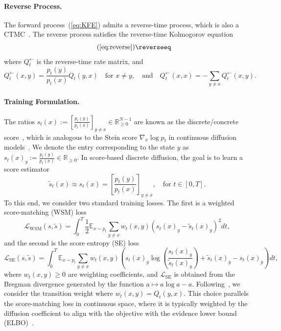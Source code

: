 \documentclass{article} %
\def\eqref#1{equation~\ref{#1}}
\newcommand{\half}{\frac{1}{2}}
\newcommand{\backQt}{Q_t^{\leftarrow}}
\newcommand{\LWSM}{\mathcal{L}_{\mathrm{WSM}}}
\newcommand{\LSE}{\mathcal{L}_{\mathrm{SE}}}
\renewcommand{\eqref}[1]{\textup{(\ref{#1})}}
\begin{document}
\paragraph{Reverse Process.} The forward process~\eqref{eq:KFE} admits a reverse-time process, which is also a CTMC~\citep{kelly1979reversibility}. The reverse process satisfies the reverse-time Kolmogorov equation
\begin{equation}\tag{\ref*{eq:reverse}}
    \reverseeq
\end{equation}
where $\backQt$ is the reverse-time rate matrix, and
\begin{equation}\label{eq:reverse_matrix}
    \backQt(x, y) = \frac{p_{t}(y)}{p_{t}(x)} Q_{t}(y, x) \quad \text{for } x \neq y, \quad \text{and} \quad \backQt(x, x) = -\sum_{y \neq x} \backQt(x, y).
\end{equation}
\paragraph{Training Formulation.} The ratios $s_t(x):=\left[ \frac{p_{t}(y)}{p_{t}(x)} \right]_{y \neq x} \in \mathbb{R}^{N-1}_{\geq 0}$ are known as the discrete/concrete score~\citep{meng2022concrete}, which is analogous to the Stein score $\nabla_x \log p_t$ in continuous diffusion models~\citep{song2021scorebased}. We denote the entry corresponding to the state $y$ as $s_t(x)_y :=\frac{p_{t}(y)}{p_{t}(x)} \in \mathbb{R}_{\geq 0}$. In score-based discrete diffusion, the goal is to learn a score estimator
\begin{equation}
    \tilde{s}_t (x) \approx s_t(x) = \left[ \frac{p_{t}(y)}{p_{t}(x)} \right]_{y \neq x}, \quad \text{for } t\in[0, T].
\end{equation}
To this end, we consider two standard training losses. The first is a weighted score-matching (WSM) loss~\citep{meng2022concrete}
\begin{equation}\label{eq:LWSM_single}
    \LWSM(s, \tilde{s})=\int_0^T \half \mathbb{E}_{x \sim p_t}
    \sum_{y\neq x}  w_t{(x,y)} \left( s_t(x)_y - \tilde{s}_t(x)_y \right)^2 dt,
\end{equation}
and the second is the score entropy (SE) loss~\citep{benton2024denoising,lou2024discrete}
\begin{equation}\label{eq:LSE_single}
    \LSE(s, \tilde{s})=\int_0^T \mathbb{E}_{x \sim p_t}
    \sum_{y\neq x}  w_t{(x,y)} \left( s_t(x)_y \log\left( \frac{s_t(x)_y}{\tilde{s}_t(x)_y}\right) + \tilde{s}_t(x)_y - s_t(x)_y \right) dt,
\end{equation}
where $w_t{(x,y)} \geq 0$ are weighting coefficients, and $\LSE$ is obtained from the Bregman divergence generated by the function $a \mapsto a \log a - a$. Following~\cite{lou2024discrete}, we consider the transition weight where $w_t{(x,y)}=Q_t(y, x)$. This choice parallels the score-matching loss in continuous space, where it is typically weighted by the diffusion coefficient to align with the objective with the evidence lower bound (ELBO)~\citep{song2021scorebased}.
\end{document}
